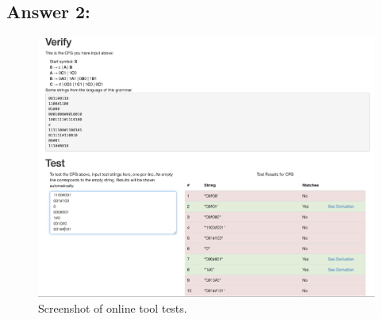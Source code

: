 \documentclass[11pt]{article}
\begin{document}
\subsection*{Answer 2:}
\begin{figure}[htbp!]
    \centering
    \includegraphics[width=0.9\linewidth]{hw8ss2.png}
    \caption{Screenshot of online tool tests.}
    \label{screenshot}
\end{figure}
\end{document}
